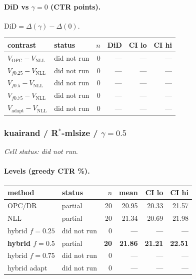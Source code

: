 \documentclass[10pt,a4paper]{article}
\begin{document}
\paragraph{DiD vs $\gamma=0$ (CTR points).} $\mathrm{DiD}=\Delta(\gamma)-\Delta(0)$.
{\centering\small\begin{tabular}{llrrrr}
\toprule contrast & status & $n$ & DiD & CI lo & CI hi \\
\midrule
$V_{\mathrm{OPC}}-V_{\mathrm{NLL}}$ & did not run & 0 & --- & --- & --- \\
$V_{f0.25}-V_{\mathrm{NLL}}$ & did not run & 0 & --- & --- & --- \\
$V_{f0.5}-V_{\mathrm{NLL}}$ & did not run & 0 & --- & --- & --- \\
$V_{f0.75}-V_{\mathrm{NLL}}$ & did not run & 0 & --- & --- & --- \\
$V_{\mathrm{adapt}}-V_{\mathrm{NLL}}$ & did not run & 0 & --- & --- & --- \\
\bottomrule\end{tabular}\par}
\bigskip
\subsubsection{kuairand / R$^*$-mlsize / $\gamma=0.5$}
\emph{Cell status: did not run}.
\paragraph{Levels (greedy CTR \%).}
{\centering\small\begin{tabular}{llrrrr}
\toprule method & status & $n$ & mean & CI lo & CI hi \\
\midrule
OPC/DR & partial & 20 & 20.95 & 20.33 & 21.57 \\
NLL & partial & 20 & 21.34 & 20.69 & 21.98 \\
hybrid $f{=}0.25$ & did not run & 0 & --- & --- & --- \\
\textbf{hybrid $f{=}0.5$} & partial & \textbf{20} & \textbf{21.86} & \textbf{21.21} & \textbf{22.51} \\
hybrid $f{=}0.75$ & did not run & 0 & --- & --- & --- \\
hybrid adapt & did not run & 0 & --- & --- & --- \\
\bottomrule\end{tabular}\par}
\end{document}
